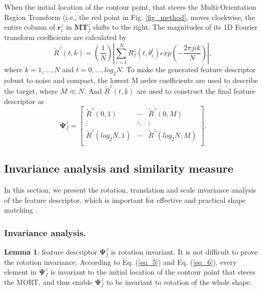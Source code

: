 \documentclass[letterpaper]{article} %
\begin{document}
When the initial location of the contour point, that steers the Multi-Orientation Region Transform (i.e., the red point in Fig. \ref{fig_method}, moves clockwise, the entire column of $\boldsymbol{r}_i^z$ in $\boldsymbol{MT}_f^z$  shifts to the right. The magnitudes of its 1D Fourier transform coefficients are calculated by
\begin{equation}
 \widetilde{R}^z (t,k)= (\frac{1}{N}) \left|\sum_{i=1}^N R_f^z (t,\theta_i^t) exp{(-\frac{2\pi jik}{N})}\right|,
 \label{eq_5}
\end{equation}
where $k=1,\dots,N$ and $t=0,\dots,log_2 N$. To make the generated feature descriptor robust to noise and compact, the lowest M order coefficients are used to describe the target, where $M\ll N$. And $\widetilde{R}^z (t,k)$ are used to construct the final feature descriptor as
\begin{equation}
\boldsymbol{\Psi}_f^z = \left[
\begin{matrix}
\widetilde{R}^z (0,1)    & \cdots & \widetilde{R}^z (0,M)      \\
 \vdots  & \ddots & \vdots \\
 \widetilde{R}^z (log_2 N,1)     & \cdots & \widetilde{R}^z (log_2 N,M)    \\
\end{matrix}
\right].
\label{eq_6}
\end{equation}



\subsection{Invariance analysis and similarity measure}

In this section, we present the rotation, translation and scale invariance analysis of the feature descriptor, which is important for effective and practical shape matching \cite{6}.

\subsubsection{Invariance analysis.}

\textbf{Lemma 1}: feature descriptor $\boldsymbol{\Psi}_f^z$ is rotation invariant. It is not difficult to prove the rotation invariance. According to Eq. (\ref{eq_5}) and Eq. (\ref{eq_6}), every element in $\boldsymbol{\Psi}_f^z$ is invariant to the initial location of the contour point that steers the MORT, and thus enable $\boldsymbol{\Psi}_f^z$ to be invariant to rotation of the whole shape.
\end{document}
